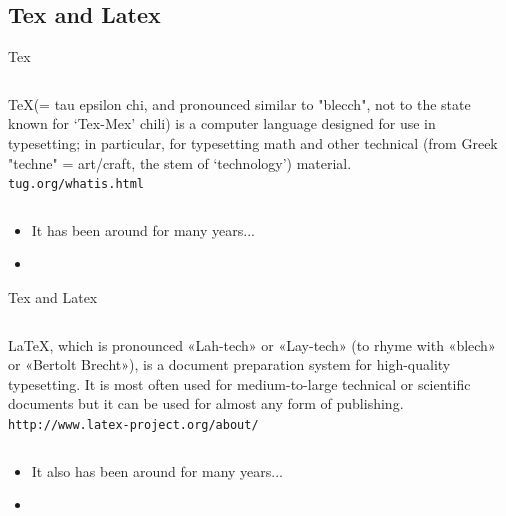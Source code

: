 \documentclass{beamer}
\begin{document}

\subsection[Latex]{Tex and Latex}


\begin{frame}{Tex}
	\begin{center}
	\begin{columns}
	\begin{block}{}
	\begin{center}
	\TeX (= tau epsilon chi, and pronounced similar to "blecch", not to the state known for `Tex-Mex' chili) is a computer language designed for use in typesetting; in particular, for typesetting math and other technical (from Greek "techne" = art/craft, the stem of `technology') material.\\
	\texttt{tug.org/whatis.html}
	\end{center}
	\end{block}
	\end{columns}
	\end{center}
	
      \begin{itemize}
	\item It has been around for many years...
	\item 
      \end{itemize}
\end{frame}



\begin{frame}{Tex and Latex}
	\begin{center}
	\begin{columns}
	\column{.95\textwidth}
	\begin{block}{}
	\begin{center}
	\LaTeX, which is pronounced «Lah-tech» or «Lay-tech» (to rhyme with «blech» or «Bertolt Brecht»), is a document preparation system for high-quality typesetting. It is most often used for medium-to-large technical or scientific documents but it can be used for almost any form of publishing.\\
	\texttt{http://www.latex-project.org/about/}
	\end{center}
	\end{block}
	\end{columns}
	\end{center}
	
      \begin{itemize}
	\item It also has been around for many years...
	\item 
      \end{itemize}
\end{frame}
\end{document}
